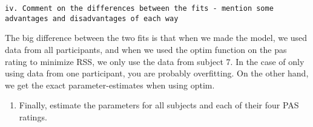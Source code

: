\documentclass[
]{article}
\providecommand{\tightlist}{%
  \setlength{\itemsep}{0pt}\setlength{\parskip}{0pt}}
\begin{document}
\begin{verbatim}
iv. Comment on the differences between the fits - mention some advantages and disadvantages of each way
\end{verbatim}

The big difference between the two fits is that when we made the model,
we used data from all participants, and when we used the optim function
on the pas rating to minimize RSS, we only use the data from subject 7.
In the case of only using data from one participant, you are probably
overfitting. On the other hand, we get the exact parameter-estimates
when using optim.

\begin{enumerate}
\def\labelenumi{\arabic{enumi})}
\setcounter{enumi}{1}
\tightlist
\item
  Finally, estimate the parameters for all subjects and each of their
  four PAS ratings.
\end{enumerate}
\end{document}
